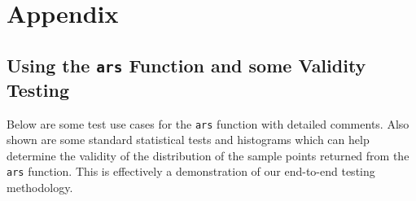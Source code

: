 \documentclass{article}\usepackage[]{graphicx}\usepackage[]{color}
\begin{document}
\newpage

\section{Appendix}

\subsection{Using the \texttt{ars} Function and some Validity Testing}

Below are some test use cases for the \texttt{ars} function with detailed 
comments. Also shown are some standard statistical tests and histograms which
can help determine the validity of the distribution of the sample points
returned from the \texttt{ars} function. This is effectively a demonstration of 
our end-to-end testing methodology.
\end{document}
